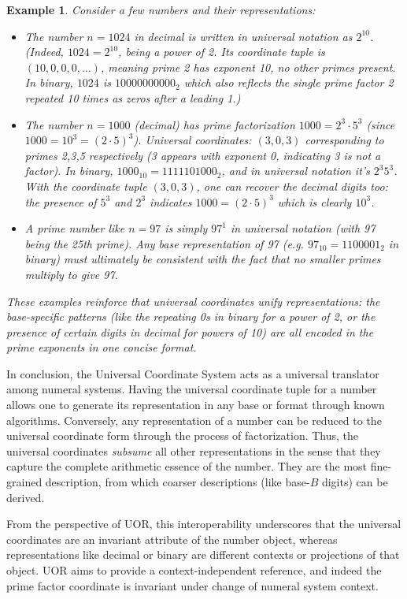 \documentclass[11pt]{article}
\newtheorem{example}{Example}
\begin{document}
\begin{example}
Consider a few numbers and their representations:
\begin{itemize}
    \item The number $n = 1024$ in decimal is written in universal notation as $2^{10}$. (Indeed, $1024 = 2^{10}$, being a power of 2. Its coordinate tuple is $(10,0,0,0,\dots)$, meaning prime 2 has exponent 10, no other primes present. In binary, $1024$ is $10000000000_2$ which also reflects the single prime factor 2 repeated 10 times as zeros after a leading 1.)
    \item The number $n = 1000$ (decimal) has prime factorization $1000 = 2^3 \cdot 5^3$ (since $1000 = 10^3 = (2\cdot5)^3$). Universal coordinates: $(3,0,3)$ corresponding to primes 2,3,5 respectively (3 appears with exponent 0, indicating 3 is not a factor). In binary, $1000_{10} = 1111101000_2$, and in universal notation it's $2^3 5^3$. With the coordinate tuple $(3,0,3)$, one can recover the decimal digits too: the presence of $5^3$ and $2^3$ indicates $1000 = (2\cdot5)^3$ which is clearly $10^3$. 
    \item A prime number like $n=97$ is simply $97^1$ in universal notation (with 97 being the 25th prime). Any base representation of 97 (e.g. $97_{10} = 1100001_2$ in binary) must ultimately be consistent with the fact that no smaller primes multiply to give 97.
\end{itemize}
These examples reinforce that universal coordinates unify representations: the base-specific patterns (like the repeating 0s in binary for a power of 2, or the presence of certain digits in decimal for powers of 10) are all encoded in the prime exponents in one concise format.
\end{example}

In conclusion, the Universal Coordinate System acts as a universal translator among numeral systems. Having the universal coordinate tuple for a number allows one to generate its representation in any base or format through known algorithms. Conversely, any representation of a number can be reduced to the universal coordinate form through the process of factorization. Thus, the universal coordinates \emph{subsume} all other representations in the sense that they capture the complete arithmetic essence of the number. They are the most fine-grained description, from which coarser descriptions (like base-$B$ digits) can be derived.

From the perspective of UOR, this interoperability underscores that the universal coordinates are an invariant attribute of the number object, whereas representations like decimal or binary are different contexts or projections of that object. UOR aims to provide a context-independent reference, and indeed the prime factor coordinate is invariant under change of numeral system context.
\end{document}
